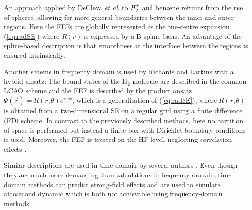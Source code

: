 An approach applied by DeCleva \textit{et al.} to $H_2^+$ \cite{H2pDeCleva} and benzene \cite{DeClevaBenzene} refrains from the use of spheres, allowing for more general boundaries between the inner and outer regions.
Here the FEFs are globally represented as the one-centre expansion (\ref{eq:radSE}) where $R(r)$ is expressed by a B-spline basis. %
An advantage of the spline-based description is that smoothness at the interface between the regions is ensured intrinsically.

Another scheme in frequency domain is used by Richards and Larkins \cite{richardsFD} with a hybrid ansatz: The bound states of the H$_2$ molecule are described in the common LCAO scheme and the FEF is described by the product ansatz $\Psi(\vec{r}) = R(r,\theta) e^{im\phi}$, which is a generalisation of (\ref{eq:radSE}), where $R(r,\theta)$ is obtained from a two-dimensional SE on a regular grid using a finite difference (FD) scheme.
In contrast to the previously described methods, here no partition of space is performed but instead a finite box with Dirichlet boundary conditions is used.
Moreover, the FEF is treated on the HF-level, neglecting correlation effects \cite{richardsFD}.

Similar descriptions are used in time domain by several authors \cite{CAPccEOM, bauch1, taoDVR}.
Even though they are much more demanding than calculations in frequency domain, time domain methods can predict strong-field effects and are used to simulate attosecond dynamic which is both not achievable using frequency-domain methods.

